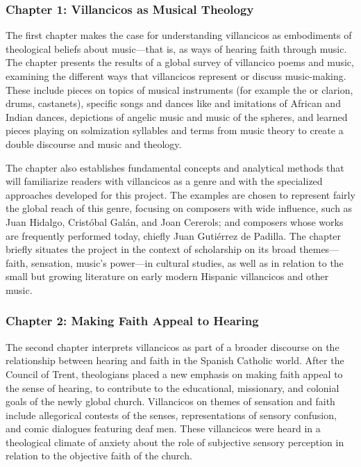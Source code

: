 \documentclass{vcbook-proposal}
\begin{document}
\subsubsection{Chapter 1: Villancicos as Musical Theology}

The first chapter makes the case for understanding villancicos as embodiments of theological beliefs about music---that is, as ways of hearing faith through music.
The chapter presents the results of a global survey of villancico poems and music, examining the different ways that villancicos represent or discuss music-making.
These include pieces on topics of musical instruments (for example the  or clarion, drums, castanets), specific songs and dances like  and imitations of African and Indian dances, depictions of angelic music and music of the spheres, and learned pieces playing on solmization syllables and terms from music theory to create a double discourse and music and theology.

The chapter also establishes fundamental concepts and analytical methods that will familiarize readers with villancicos as a genre and with the specialized approaches developed for this project.
The examples are chosen to represent fairly the global reach of this genre, focusing on composers with wide influence, such as Juan Hidalgo, Cristóbal Galán, and Joan Cererols; and composers whose works are frequently performed today, chiefly Juan Gutiérrez de Padilla.
The chapter briefly situates the project in the context of scholarship on its broad themes---faith, sensation, music's power---in cultural studies, as well as in relation to the small but growing literature on early modern Hispanic villancicos and other music.

\subsubsection{Chapter 2: Making Faith Appeal to Hearing}

The second chapter interprets villancicos as part of a broader discourse on the relationship between hearing and faith in the Spanish Catholic world.
After the Council of Trent, theologians placed a new emphasis on making faith appeal to the sense of hearing, to contribute to the educational, missionary, and colonial goals of the newly global church.
Villancicos on themes of sensation and faith include allegorical contests of the senses, representations of sensory confusion, and comic dialogues featuring deaf men.
These villancicos were heard in a theological climate of anxiety about the role of subjective sensory perception in relation to the objective faith of the church.
\end{document}
